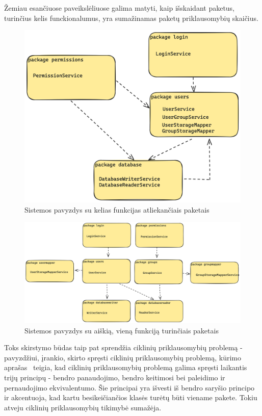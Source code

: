 Žemiau esančiuose paveikslėliuose galima matyti, kaip išskaidant paketus, turinčius kelis funckionalumus, yra sumažinamas paketų
priklausomybių skaičius.
\begin{figure}[H]
    \centering
    \includegraphics[scale=0.15]{img/excesive_deps}
    \caption{Sistemos pavyzdys su kelias funkcijas atliekančiais paketais}
    \label{img:excesive_deps}
\end{figure}


\begin{figure}[H]
    \centering
    \includegraphics[scale=0.13]{img/good_deps}
    \caption{Sistemos pavyzdys su aiškią, vieną funkciją turinčiais paketais}
    \label{img:good_deps}
\end{figure}

Toks skirstymo būdas taip pat sprendžia ciklinių priklausomybių problemą - pavyzdžiui, įrankio, skirto spręsti ciklinių priklausomybių problemą,
kūrimo aprašas~\cite{CircularDependencies} teigia, kad ciklinių priklausomybių problemą galima spręsti laikantis trijų principų -
bendro panaudojimo, bendro keitimosi bei paleidimo ir pernaudojimo ekvivalentumo.
Šie principai yra išvesti iš bendro saryšio principo ir akcentuoja, kad kartu besikeičiančios klasės turėtų būti viename pakete.
Tokiu atveju ciklinių priklausomybių tikimybė sumažėja.

